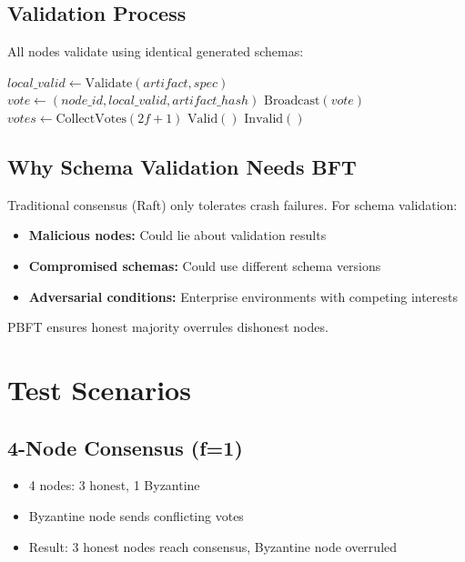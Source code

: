 \subsection{Validation Process}

All nodes validate using identical generated schemas:

\begin{algorithm}
\caption{Consensus Validation}
\begin{algorithmic}[1]
    \State $local\_valid \gets \text{Validate}(artifact, spec)$
    \State $vote \gets (node\_id, local\_valid, artifact\_hash)$
    \State $\text{Broadcast}(vote)$
    \State $votes \gets \text{CollectVotes}(2f+1)$
        \State \Return $\text{Valid}()$
    \Else
        \State \Return $\text{Invalid}()$
    \EndIf
\EndProcedure
\end{algorithmic}
\end{algorithm}

\subsection{Why Schema Validation Needs BFT}

Traditional consensus (Raft) only tolerates crash failures. For schema validation:

\begin{itemize}
    \item \textbf{Malicious nodes:} Could lie about validation results
    \item \textbf{Compromised schemas:} Could use different schema versions
    \item \textbf{Adversarial conditions:} Enterprise environments with competing interests
\end{itemize}

PBFT ensures honest majority overrules dishonest nodes.

\section{Test Scenarios}

\subsection{4-Node Consensus (f=1)}

\begin{itemize}
    \item 4 nodes: 3 honest, 1 Byzantine
    \item Byzantine node sends conflicting votes
    \item Result: 3 honest nodes reach consensus, Byzantine node overruled
\end{itemize}

